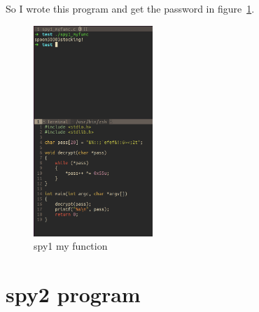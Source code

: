\documentclass{article}
\theoremstyle{remark}
\theoremstyle{definition}
\begin{document}
    So I wrote this program and get the password in figure~\ref{fig:spy1_myfunc}.

    \begin{figure}[!htbp]
        \centering
        \includegraphics[width=0.4\textwidth]{img/spy1_myfunc.png}
        \caption{spy1 my function}
        \label{fig:spy1_myfunc}
    \end{figure}


    \section{spy2 program}
\end{document}

